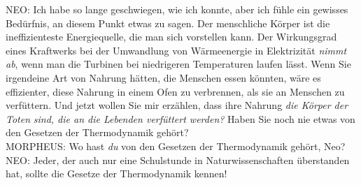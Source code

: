 \begin{playdialog}
NEO: Ich habe so lange geschwiegen, wie ich konnte, aber ich fühle ein gewisses Bedürfnis, an diesem Punkt etwas zu sagen. Der menschliche Körper ist die ineffizienteste Energiequelle, die man sich vorstellen kann. Der Wirkungsgrad eines Kraftwerks bei der Umwandlung von Wärmeenergie in Elektrizität \emph{nimmt ab}, wenn man die Turbinen bei niedrigeren Temperaturen laufen lässt. Wenn Sie irgendeine Art von Nahrung hätten, die Menschen essen könnten, wäre es effizienter, diese Nahrung in einem Ofen zu verbrennen, als sie an Menschen zu verfüttern. Und jetzt wollen Sie mir erzählen, dass ihre Nahrung \emph{die Körper der Toten} \emph{sind, die an die Lebenden verfüttert werden?} Haben Sie noch nie etwas von den Gesetzen der Thermodynamik gehört?\\

MORPHEUS: Wo hast \emph{du} von den Gesetzen der Thermodynamik gehört, Neo?\\

NEO: Jeder, der auch nur eine Schulstunde in Naturwissenschaften überstanden hat, sollte die Gesetze der Thermodynamik kennen!\\


\end{playdialog}

